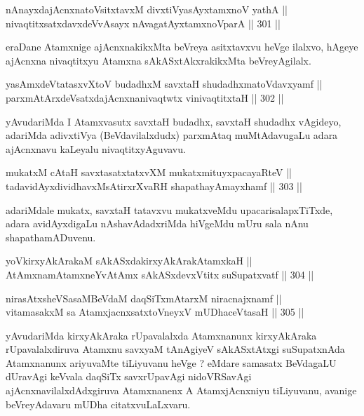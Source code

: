 \begin{shl}
nAnayxdajAcnxnatoV\s sitxtavxM divxtiVyasAyx\s \s tamxnoV yathA || \\
nivaqtitxsatxdavxdeVvAsayx nAvagatAyxtamxnoV\s parA ||  301 ||  
\end{shl}

\begin{artha}
eraDane Atamxnige ajAcnxnakikxMta beVreya asitxtavxvu heVge ilalxvo, hAgeye ajAcnxna nivaqtitxyu Atamxna sAkASxtAkxrakikxMta beVreyAgilalx.
\end{artha}

\begin{shl}
yasAmxdeVtatasxvXtoV budadhxM savxtaH shudadhxmatoV\s davxyamf || \\
parxmAtArxdeVsatxdajAcnxnanivaqtwtx vinivaqtitxtaH ||  302 || 
\end{shl}

\begin{artha}
yAvudariMda I Atamxvasutx savxtaH budadhx, savxtaH shudadhx vAgideyo,
adariMda adivxtiVya (BeVdavilalxdudx) parxmAtaq muMtAdavugaLu adara
ajAcnxnavu kaLeyalu nivaqtitxyAguvavu.
\end{artha}

\begin{shl}
mukatxM cAtaH savxtasatxtatxvXM mukatxmituyxpacayaRteV || \\
tadavidAyxdividhavxMsAtirxrXvaRH shapathayAmayxhamf ||  303 ||  
\end{shl}

\begin{artha}
adariMdale mukatx, savxtaH tatavxvu mukatxveMdu upacarisalapxTiTxde,
adara avidAyxdigaLu nAshavAdadxriMda hiVgeMdu mUru sala nAnu
shapathamADuvenu.
\end{artha}

\begin{shl}
yoV\s kirxyAkArakaM sAkASxdakirxyAkArakAtamxkaH || \\
AtAmxnamAtamxneYvA\s \s tAmx sAkASxdevxVtitx suSupatxvatf ||  304 ||  
\end{shl}

\begin{shl}
nirasAtxsheVSasaMBeVdaM daqSiTxmAtarxM niracnajxnamf || \\
vitamasakxM sa AtamxjacnxsatxtoV\s neyxV mUDhaceVtasaH ||  305 ||  
\end{shl}

\begin{artha}
yAvudariMda kirxyAkAraka rUpavalalxda Atamxnanunx kirxyAkAraka
rUpavalalxdiruva Atamxnu savxyaM tAnAgiyeV sAkASxtAtxgi suSupatxnAda
Atamxnanunx ariyuvaMte tiLiyuvanu heVge ? eMdare samasatx BeVdagaLU
dUravAgi keVvala daqSiTx savxrUpavAgi nidoVRSavAgi
ajAcnxnavilalxdAdxgiruva Atamxnanenx A AtamxjAcnxniyu tiLiyuvanu,
avanige beVreyAdavaru mUDha citatxvuLaLxvaru.
\end{artha}

